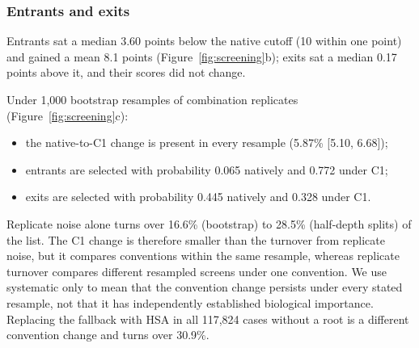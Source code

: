 \documentclass[11pt]{article}
\begin{document}

\subsubsection*{Entrants and exits} Entrants sat a median 3.60 points below the native cutoff (10 within one point) and gained a mean 8.1 points (Figure~\ref{fig:screening}b); exits sat a median 0.17 points above it, and their scores did not change.

Under 1,000 bootstrap resamples of combination replicates (Figure~\ref{fig:screening}c):
\begin{itemize}
\item the native-to-C1 change is present in every resample (5.87\% [5.10, 6.68]);
\item entrants are selected with probability 0.065 natively and 0.772 under C1;
\item exits are selected with probability 0.445 natively and 0.328 under C1.
\end{itemize}
Replicate noise alone turns over 16.6\% (bootstrap) to 28.5\% (half-depth splits) of the list. The C1 change is therefore smaller than the turnover from replicate noise, but it compares conventions within the same resample, whereas replicate turnover compares different resampled screens under one convention. We use systematic only to mean that the convention change persists under every stated resample, not that it has independently established biological importance. Replacing the fallback with HSA in all 117,824 cases without a root is a different convention change and turns over 30.9\%.
\end{document}
